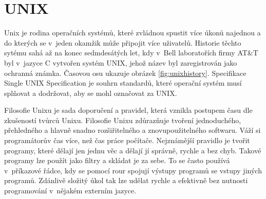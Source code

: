 \documentclass[thesis=M,czech]{FITthesis}[2012/06/26]
\begin{document}
\section{UNIX}

Unix je rodina operačních systémů, které zvládnou spustit více úkonů najednou a do kterých se v~jeden okamžik může připojit více uživatelů. Historie těchto sytému sahá až na konec sedmdesátých let, kdy v~Bell laboratořích firmy AT\&T byl v~jazyce C vytvořen systém UNIX, jehož název byl zaregistrován jako ochranná známka. Časovou osu ukazuje obrázek \ref{fig:unixhistory}. Specifikace Single UNIX Specification \cite{sus} je souhrn standardů, které operační systém musí splňovat a dodržovat, aby se mohl označovat za UNIX.

Filosofie Unixu je sada doporučení a pravidel, která vznikla postupem času dle zkušeností tvůrců Unixu. Filosofie Unixu zdůrazňuje tvoření jednoduchého, přehledného a hlavně snadno rozšiřitelného a znovupoužitelného softwaru. Váží si programátorův čas více, než čas práce počítače. Nejznámější pravidlo je tvořit programy, které dělají jen jednu věc a dělají jí správně, rychle a bez chyb. Takové programy lze použít jako filtry a skládat je za sebe. To se často používá v~příkazové řádce, kdy se pomocí rour spojují výstupy programů se vstupy jiných programů. Zdánlivě složitý úkol tak lze udělat rychle a efektivně bez nutnosti programování v~nějakém externím jazyce.
\end{document}
